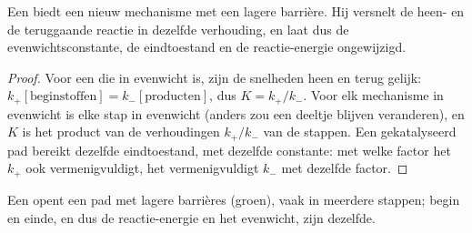 \begin{proposition}\label{prop:b1:elementary-steps:catalysis}
Een  biedt een nieuw mechanisme met een lagere barrière. Hij
versnelt de heen- en de teruggaande reactie in dezelfde verhouding, en
laat dus de evenwichtsconstante, de eindtoestand en de reactie-energie
ongewijzigd.
\end{proposition}

\begin{proof}
Voor een  die in evenwicht is, zijn de snelheden heen en
terug gelijk: $k_+[\text{beginstoffen}] = k_-[\text{producten}]$, dus $K = k_+/k_-$.
Voor elk mechanisme in evenwicht is elke stap in evenwicht (anders zou
een deeltje blijven veranderen), en $K$ is het product van de
verhoudingen $k_+/k_-$ van de stappen. Een gekatalyseerd pad bereikt
dezelfde eindtoestand, met dezelfde constante: met welke factor het $k_+$
ook vermenigvuldigt, het vermenigvuldigt $k_-$ met dezelfde factor.
\end{proof}

\begin{omfigure}

{\small Een  opent een pad met lagere barrières (groen), vaak
in meerdere stappen; begin en einde, en dus de reactie-energie en het
evenwicht, zijn dezelfde.}
\end{omfigure}

